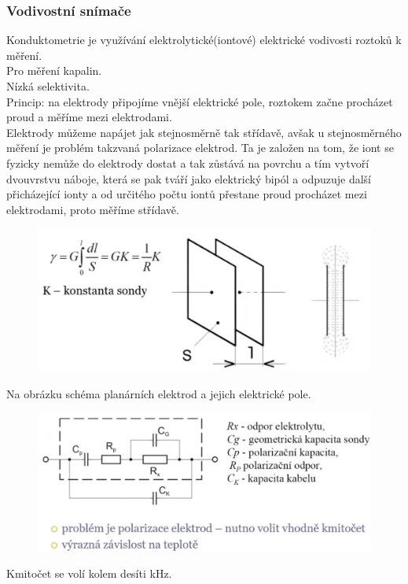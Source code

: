 \subsubsection{Vodivostní snímače}
Konduktometrie je využívání elektrolytické(iontové) elektrické vodivosti roztoků k měření.\\
Pro měření kapalin.\\
Nízká selektivita.\\
Princip: na elektrody připojíme vnější elektrické pole, roztokem začne procházet proud a měříme mezi elektrodami.\\
Elektrody můžeme napájet jak stejnosměrně tak střídavě, avšak u stejnosměrného měření je problém takzvaná polarizace elektrod. Ta je založen na tom, že iont se fyzicky nemůže do elektrody dostat a tak zůstává na povrchu a tím vytvoří dvouvrstvu náboje, která se pak tváří jako elektrický bipól a odpuzuje další přicházející ionty a od určitého počtu iontů přestane proud procházet mezi elektrodami, proto měříme střídavě.\\
\newpage
\begin{figure}[h!]
    \centering
    \includegraphics[scale = 0.1]{img/ElektrodSonda.png}
\end{figure}
Na obrázku schéma planárních elektrod a jejich elektrické pole.\\
\begin{figure}[h!]
    \centering
    \includegraphics[scale = 0.1]{img/NahrSchemaVodiv.png}
\end{figure}
Kmitočet se volí kolem desíti kHz.\\
